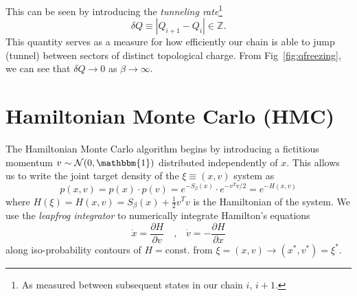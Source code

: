 \documentclass[a4paper,11pt]{article}
\begin{document}
This can be seen by introducing the \emph{tunneling rate}\footnote{As measured
between subsequent states in our chain \(i\), \(i+1\).}
%
\begin{equation}
    \delta Q \equiv \left|Q_{i+1} - Q_{i}\right| \in \mathbb{Z}.
\end{equation}
%
This quantity serves as a measure for how efficiently our chain is able to jump
(tunnel) between sectors of distinct topological charge.
%
From Fig~\ref{fig:qfreezing}, we can see that \(\delta Q\rightarrow 0\) as
\(\beta\rightarrow \infty\).
%
\section{\label{sec:hmc}Hamiltonian Monte Carlo (HMC)}
%
%
The Hamiltonian Monte Carlo algorithm begins by introducing a fictitious
momentum \(v \sim \mathcal{N} (0, \mathbbm{1})\) distributed independently of
\(x\).
%
This allows us to write the joint target density of the \(\xi \equiv (x, v)\)
system as
%
\begin{equation}
    p(x, v) = p(x) \cdot p(v) = e^{-S_{\beta}(x)}\cdot e^{-v^{T} v / 2} = e^{-H(x, v)}
\end{equation}
%
where \(H(\xi) = H(x, v) = S_{\beta}(x) + \frac{1}{2} v^{T} v\) is the
Hamiltonian of the system.
%
We use the \emph{leapfrog integrator} to numerically integrate Hamilton's
equations
%
\begin{equation}
    \dot{x} = \frac{\partial H}{\partial v}\quad \text{,} \quad \dot{v} = - \frac{\partial H}{\partial x}
\end{equation}
%
along iso-probability contours of \(H =\text{const.}\) from \(\xi = (x,
v)\rightarrow (x^{\ast}, v^{\ast}) = \xi^{\ast}\).
%
\end{document}
